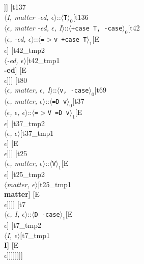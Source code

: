 \documentclass[11pt]{article}
\begin{document}
\begin{enumerate}
\begin{forest}
	[S\\$\langle$\textit{I matter -ed}$\rangle$[t158\\$\langle$\textit{$\epsilon${,} $\epsilon${,} I matter -ed}$\rangle$::$\langle$\texttt{C}$\rangle_0$[t0\\$\langle$\textit{$\epsilon${,} $\epsilon${,} $\epsilon$}$\rangle$::$\langle$\texttt{{=}T C}$\rangle_1$[E\\$\epsilon$] [t0_tmp2\\$\langle$\textit{$\epsilon${,} $\epsilon$}$\rangle$[t0_tmp1\\$\epsilon$] [E\\$\epsilon$]]] [t137\\$\langle$\textit{I{,} matter -ed{,} $\epsilon$}$\rangle$::$\langle$\texttt{T}$\rangle_0$[t136\\$\langle$\textit{$\epsilon${,} matter -ed{,} $\epsilon${,} I}$\rangle$::$\langle$\texttt{+case T{,} -case}$\rangle_0$[t42\\$\langle$\textit{$\epsilon${,} -ed{,} $\epsilon$}$\rangle$::$\langle$\texttt{{=}$>$v +case T}$\rangle_1$[E\\$\epsilon$] [t42_tmp2\\$\langle$\textit{-ed{,} $\epsilon$}$\rangle$[t42_tmp1\\\textbf{-ed}] [E\\$\epsilon$]]] [t80\\$\langle$\textit{$\epsilon${,} matter{,} $\epsilon${,} I}$\rangle$::$\langle$\texttt{v{,} -case}$\rangle_0$[t69\\$\langle$\textit{$\epsilon${,} matter{,} $\epsilon$}$\rangle$::$\langle$\texttt{{=}D v}$\rangle_0$[t37\\$\langle$\textit{$\epsilon${,} $\epsilon${,} $\epsilon$}$\rangle$::$\langle$\texttt{{=}$>$V {=}D v}$\rangle_1$[E\\$\epsilon$] [t37_tmp2\\$\langle$\textit{$\epsilon${,} $\epsilon$}$\rangle$[t37_tmp1\\$\epsilon$] [E\\$\epsilon$]]] [t25\\$\langle$\textit{$\epsilon${,} matter{,} $\epsilon$}$\rangle$::$\langle$\texttt{V}$\rangle_1$[E\\$\epsilon$] [t25_tmp2\\$\langle$\textit{matter{,} $\epsilon$}$\rangle$[t25_tmp1\\\textbf{matter}] [E\\$\epsilon$]]]] [t7\\$\langle$\textit{$\epsilon${,} I{,} $\epsilon$}$\rangle$::$\langle$\texttt{D -case}$\rangle_1$[E\\$\epsilon$] [t7_tmp2\\$\langle$\textit{I{,} $\epsilon$}$\rangle$[t7_tmp1\\\textbf{I}] [E\\$\epsilon$]]]]]]]]
	\end{forest}
	\newpage


\end{enumerate}
\end{document}
